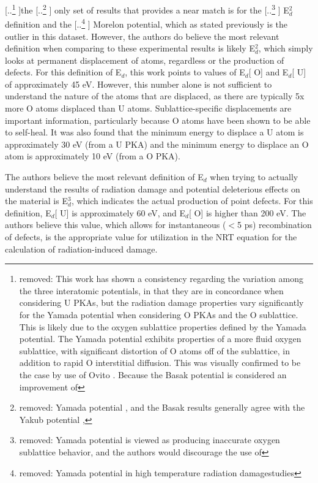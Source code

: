 \documentclass[review]{elsarticle} %
\providecommand{\DIFaddtex}[1]{{\protect\color{blue} \sf #1}} %
\providecommand{\DIFdeltex}[1]{{\protect\color{red} [..\footnote{removed: #1} ]}} %
\providecommand{\DIFaddbegin}{} %
\providecommand{\DIFaddend}{} %
\providecommand{\DIFdelbegin}{} %
\providecommand{\DIFdelend}{} %
\providecommand{\DIFadd}[1]{\texorpdfstring{\DIFaddtex{#1}}{#1}} %
\providecommand{\DIFdel}[1]{\texorpdfstring{\DIFdeltex{#1}}{}} %
\newcommand{\DIFscaledelfig}{0.5}
\newlength{\DIFdelgraphicswidth} %
\newlength{\DIFdelgraphicsheight} %
\newcommand{\DIFaddincludegraphics}[2][]{{\color{blue}\fbox{\DIFOincludegraphics[#1]{#2}}}} %
\newcommand{\DIFdelincludegraphics}[2][]{%
\sbox{\DIFdelgraphicsbox}{\DIFOincludegraphics[#1]{#2}}%
\settoboxwidth{\DIFdelgraphicswidth}{\DIFdelgraphicsbox} %
\settoboxtotalheight{\DIFdelgraphicsheight}{\DIFdelgraphicsbox} %
\scalebox{\DIFscaledelfig}{%
\parbox[b]{\DIFdelgraphicswidth}{\usebox{\DIFdelgraphicsbox}\\[-\baselineskip] \rule{\DIFdelgraphicswidth}{0em}}\llap{\resizebox{\DIFdelgraphicswidth}{\DIFdelgraphicsheight}{%
\setlength{\unitlength}{\DIFdelgraphicswidth}%
\begin{picture}(1,1)%
\thicklines\linethickness{2pt} %
{\color[rgb]{1,0,0}\put(0,0){\framebox(1,1){}}}%
{\color[rgb]{1,0,0}\put(0,0){\line( 1,1){1}}}%
{\color[rgb]{1,0,0}\put(0,1){\line(1,-1){1}}}%
\end{picture}%
}\hspace*{3pt}}} %
} %
\DeclareRobustCommand{\DIFaddbegin}{\DIFOaddbegin \let\includegraphics\DIFaddincludegraphics} %
\DeclareRobustCommand{\DIFaddend}{\DIFOaddend \let\includegraphics\DIFOincludegraphics} %
\DeclareRobustCommand{\DIFdelbegin}{\DIFOdelbegin \let\includegraphics\DIFdelincludegraphics} %
\DeclareRobustCommand{\DIFdelend}{\DIFOaddend \let\includegraphics\DIFOincludegraphics} %
\begin{document}
\DIFdel{This work has shown a consistency regarding the variation among the three interatomic potentials, in that they are in concordance when considering U PKAs, but the radiation damage properties vary significantly for the Yamada potential when considering O PKAs and the O sublattice. This is likely due to the oxygen sublattice properties defined by the Yamada potential. The Yamada potential exhibits properties of a more fluid oxygen sublattice, with significant distortion of O atoms off of the sublattice, in addition to rapid O interstitial diffusion. This was visually confirmed to be the case by use of Ovito \cite{ovito}. Because the Basak potential is considered an improvement of }\DIFdelend the \DIFdelbegin \DIFdel{Yamada potential \cite{basak}, and the Basak results generally agree with the Yakub potential , }\DIFdelend \DIFaddbegin \DIFadd{only set of results that provides a near match is for }\DIFaddend the \DIFdelbegin \DIFdel{Yamada potential is viewed as producing inaccurate oxygen sublattice behavior, and the authors would discourage the use of }\DIFdelend \DIFaddbegin \DIFadd{E$_d^2$ definition and }\DIFaddend the \DIFdelbegin \DIFdel{Yamada potential in high temperature radiation damagestudies}\DIFdelend \DIFaddbegin \DIFadd{Morelon potential, which as stated previously is the outlier in this dataset. However, the authors do believe the most relevant definition when comparing to these experimental results is likely E$_d^2$, which simply looks at permanent displacement of atoms, regardless or the production of defects. For this definition of E$_d$, this work points to values of E$_d$}[\DIFadd{O}] \DIFadd{and E$_d$}[\DIFadd{U}] \DIFadd{of approximately 45 eV. However, this number alone is not sufficient to understand the nature of the atoms that are displaced, as there are typically 5x more O atoms displaced than U atoms. Sublattice-specific displacements are important information, particularly because O atoms have been shown to be able to self-heal. It was also found that the minimum energy to displace a U atom is approximately 30 eV (from a U PKA) and the minimum energy to displace an O atom is approximately 10 eV (from a O PKA).
}

\DIFadd{The authors believe the most relevant definition of E$_d$ when trying to actually understand the results of radiation damage and potential deleterious effects on the material is E$_d^3$, which indicates the actual production of point defects. For this definition, E$_d$}[\DIFadd{U}] \DIFadd{is approximately 60 eV, and E$_d$}[\DIFadd{O}] \DIFadd{is higher than 200 eV. The authors believe this value, which allows for instantaneous ($<$5 ps) recombination of defects, is the appropriate value for utilization in the NRT equation for the calculation of radiation-induced damage}\DIFaddend .
\end{document}

